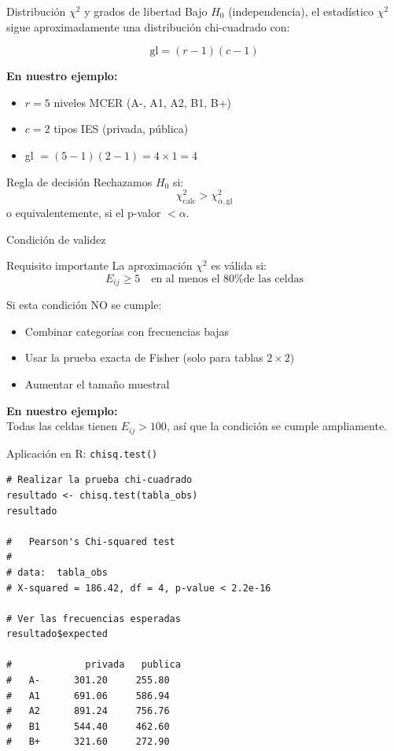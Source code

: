 \documentclass[aspectratio=169, 11pt]{beamer}
\begin{document}
\begin{frame}{Distribución $\chi^2$ y grados de libertad}
Bajo $H_0$ (independencia), el estadístico $\chi^2$ sigue aproximadamente una distribución chi-cuadrado con:

\[
\text{gl} = (r - 1)(c - 1)
\]

\vspace{0.2cm}
\textbf{En nuestro ejemplo:}
\begin{itemize}
  \item $r = 5$ niveles MCER (A-, A1, A2, B1, B+)
  \item $c = 2$ tipos IES (privada, pública)
  \item gl $= (5-1)(2-1) = 4 \times 1 = 4$
\end{itemize}

\vspace{0.3cm}
\begin{block}{Regla de decisión}
Rechazamos $H_0$ si:
\[
\chi^2_{\text{calc}} > \chi^2_{\alpha, \text{gl}}
\]
o equivalentemente, si el p-valor $< \alpha$.
\end{block}
\end{frame}

\begin{frame}{Condición de validez}
\begin{alertblock}{Requisito importante}
La aproximación $\chi^2$ es válida si:
\[
E_{ij} \geq 5 \quad \text{en al menos el 80\% de las celdas}
\]
\end{alertblock}

\vspace{0.2cm}
Si esta condición NO se cumple:
\begin{itemize}
  \item Combinar categorías con frecuencias bajas
  \item Usar la prueba exacta de Fisher (solo para tablas $2 \times 2$)
  \item Aumentar el tamaño muestral
\end{itemize}

\vspace{0.3cm}
\textbf{En nuestro ejemplo:}\\
Todas las celdas tienen $E_{ij} > 100$, así que la condición se cumple ampliamente.
\end{frame}

\begin{frame}[fragile]{Aplicación en R: \texttt{chisq.test()}}
\begin{lstlisting}
# Realizar la prueba chi-cuadrado
resultado <- chisq.test(tabla_obs)
resultado

#   Pearson's Chi-squared test
#
# data:  tabla_obs
# X-squared = 186.42, df = 4, p-value < 2.2e-16

# Ver las frecuencias esperadas
resultado$expected

#             privada   publica
#   A-      301.20     255.80
#   A1      691.06     586.94
#   A2      891.24     756.76
#   B1      544.40     462.60
#   B+      321.60     272.90
\end{lstlisting}
\end{frame}
\end{document}
